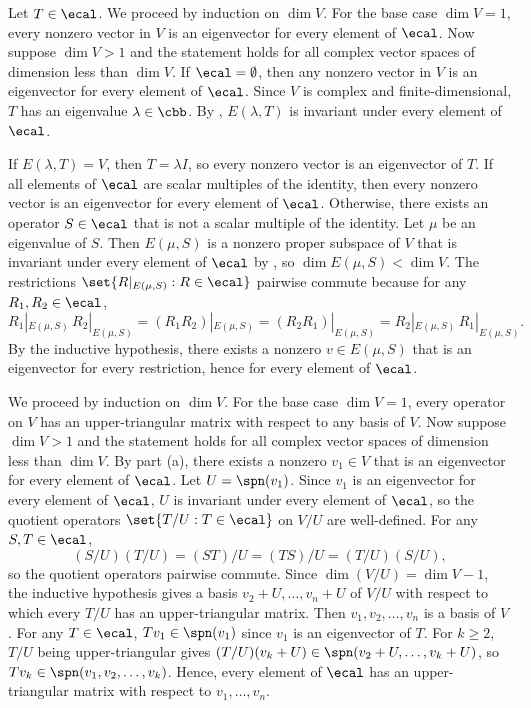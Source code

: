 \begin{solenum}
    \item Let $T \in \ecal$.
    We proceed by induction on $\dim V$.
    For the base case $\dim V = 1$, every nonzero vector in $V$ is an eigenvector for every element of $\ecal$.
    Now suppose $\dim V > 1$ and the statement holds for all complex vector spaces of dimension less than $\dim V$.
    If $\ecal = \emptyset$, then any nonzero vector in $V$ is an eigenvector for every element of $\ecal$.
    Since $V$ is complex and finite-dimensional, $T$ has an eigenvalue $\lambda \in \cbb$.
    By , $E(\lambda, T)$ is invariant under every element of $\ecal$.

    If $E(\lambda, T) = V$, then $T = \lambda I$, so every nonzero vector is an eigenvector of $T$.
    If all elements of $\ecal$ are scalar multiples of the identity, then every nonzero vector is an eigenvector for every element of $\ecal$.
    Otherwise, there exists an operator $S \in \ecal$ that is not a scalar multiple of the identity.
    Let $\mu$ be an eigenvalue of $S$.
    Then $E(\mu, S)$ is a nonzero proper subspace of $V$ that is invariant under every element of $\ecal$ by , so $\dim E(\mu, S) < \dim V$.
    The restrictions $\set{R|_{E(\mu, S)} : R \in \ecal}$ pairwise commute because for any $R_1, R_2 \in \ecal$,
    \[
        R_1|_{E(\mu, S)} \, R_2|_{E(\mu, S)} = (R_1 R_2)|_{E(\mu, S)} = (R_2 R_1)|_{E(\mu, S)} = R_2|_{E(\mu, S)} \, R_1|_{E(\mu, S)}.
    \]
    By the inductive hypothesis, there exists a nonzero $v \in E(\mu, S)$ that is an eigenvector for every restriction, hence for every element of $\ecal$.
    \item We proceed by induction on $\dim V$.
    For the base case $\dim V = 1$, every operator on $V$ has an upper-triangular matrix with respect to any basis of $V$.
    Now suppose $\dim V > 1$ and the statement holds for all complex vector spaces of dimension less than $\dim V$.
    By part (a), there exists a nonzero $v_1 \in V$ that is an eigenvector for every element of $\ecal$.
    Let $U = \spn(v_1)$.
    Since $v_1$ is an eigenvector for every element of $\ecal$, $U$ is invariant under every element of $\ecal$, so the quotient operators $\set{T / U : T \in \ecal}$ on $V / U$ are well-defined.
    For any $S, T \in \ecal$,
    \[
        (S / U)(T / U) = (ST) / U = (TS) / U = (T / U)(S / U),
    \]
    so the quotient operators pairwise commute.
    Since $\dim(V / U) = \dim V - 1$, the inductive hypothesis gives a basis $v_2 + U, \ldots, v_n + U$ of $V / U$ with respect to which every $T / U$ has an upper-triangular matrix.
    Then $v_1, v_2, \ldots, v_n$ is a basis of $V$.
    For any $T \in \ecal$, $Tv_1 \in \spn(v_1)$ since $v_1$ is an eigenvector of $T$.
    For $k \geq 2$, $T / U$ being upper-triangular gives $(T / U)(v_k + U) \in \spn(v_2 + U, \ldots, v_k + U)$, so $Tv_k \in \spn(v_1, v_2, \ldots, v_k)$.
    Hence, every element of $\ecal$ has an upper-triangular matrix with respect to $v_1, \ldots, v_n$.
\end{solenum}

